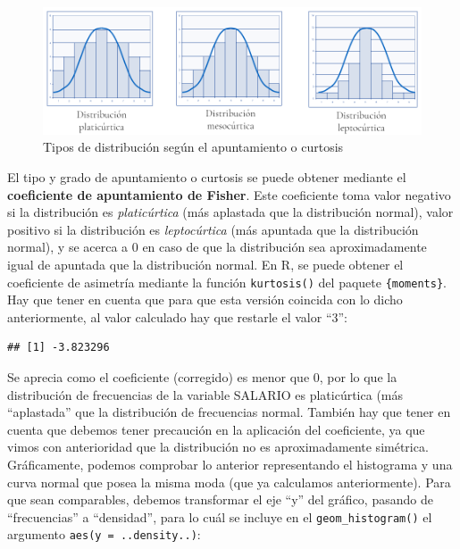 \documentclass[
]{book}
\newenvironment{Shaded}{\begin{snugshade}}{\end{snugshade}}
\newcommand{\CommentTok}[1]{\textcolor[rgb]{0.56,0.35,0.01}{\textit{#1}}}
\newcommand{\DecValTok}[1]{\textcolor[rgb]{0.00,0.00,0.81}{#1}}
\newcommand{\FunctionTok}[1]{\textcolor[rgb]{0.13,0.29,0.53}{\textbf{#1}}}
\newcommand{\NormalTok}[1]{#1}
\newcommand{\OtherTok}[1]{\textcolor[rgb]{0.56,0.35,0.01}{#1}}
\newcommand{\SpecialCharTok}[1]{\textcolor[rgb]{0.81,0.36,0.00}{\textbf{#1}}}
\let\Oldincludegraphics\includegraphics
\renewcommand{\includegraphics}[2][]{%
  \Oldincludegraphics[#1]{#2}%
}
\begin{document}
\begin{figure}
\centering
\includegraphics{figuras/curtosis.png}
\caption{Tipos de distribución según el apuntamiento o curtosis}
\end{figure}

El tipo y grado de apuntamiento o curtosis se puede obtener mediante el \textbf{coeficiente de apuntamiento de Fisher}.
Este coeficiente toma valor negativo si la distribución es \emph{platicúrtica} (más aplastada que la distribución normal), valor positivo si la distribución es \emph{leptocúrtica} (más apuntada que la distribución normal), y se acerca a 0 en caso de que la distribución sea aproximadamente igual de apuntada que la distribución normal.
En R, se puede obtener el coeficiente de asimetría mediante la función \texttt{kurtosis()} del paquete \texttt{\{moments\}}.
Hay que tener en cuenta que para que esta versión coincida con lo dicho anteriormente, al valor calculado hay que restarle el valor ``3'':

\begin{Shaded}
\end{Shaded}

\begin{verbatim}
## [1] -3.823296
\end{verbatim}

Se aprecia como el coeficiente (corregido) es menor que 0, por lo que la distribución de frecuencias de la variable SALARIO es platicúrtica (más ``aplastada'' que la distribución de frecuencias normal. También hay que tener en cuenta que debemos tener precaución en la aplicación del coeficiente, ya que vimos con anterioridad que la distribución no es aproximadamente simétrica. Gráficamente, podemos comprobar lo anterior representando el histograma y una curva normal que posea la misma moda (que ya calculamos anteriormente).
Para que sean comparables, debemos transformar el eje ``y'' del gráfico, pasando de ``frecuencias'' a ``densidad'', para lo cuál se incluye en el \texttt{geom\_histogram()} el argumento \texttt{aes(y\ =\ ..density..)}:
\end{document}
